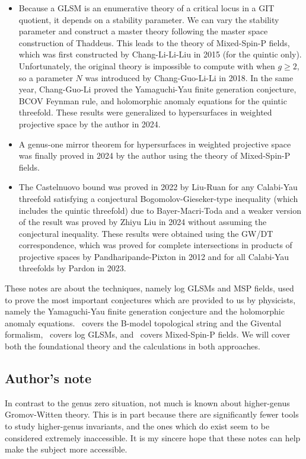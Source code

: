 \documentclass[10pt]{amsart}
\theoremstyle{definition}
\theoremstyle{remark}
\theoremstyle{plain}
\theoremstyle{definition}
\theoremstyle{remark}
\newcommand{\1}{\mathbf{1}}
\newcommand{\2}{\mathbf{2}}
\newcommand{\3}{\mathbf{3}}
\begin{document}
\begin{itemize}
    \item Because a GLSM is an enumerative theory of a critical locus in a GIT quotient, it depends on a stability parameter. We can vary the stability parameter and construct a master theory following the master space construction of Thaddeus. This leads to the theory of Mixed-Spin-P fields, which was first constructed by Chang-Li-Li-Liu in 2015 (for the quintic only). Unfortunately, the original theory is impossible to compute with when $g \geq 2$, so a parameter $N$ was introduced by Chang-Guo-Li-Li in 2018. In the same year, Chang-Guo-Li proved the Yamaguchi-Yau finite generation conjecture, BCOV Feynman rule, and holomorphic anomaly equations for the quintic threefold. These results were generalized to hypersurfaces in weighted projective space by the author in 2024.
    \item A genus-one mirror theorem for hypersurfaces in weighted projective space was finally proved in 2024 by the author using the theory of Mixed-Spin-P fields.
    \item The Castelnuovo bound was proved in 2022 by Liu-Ruan for any Calabi-Yau threefold satisfying a conjectural Bogomolov-Gieseker-type inequality (which includes the quintic threefold) due to Bayer-Macri-Toda and a weaker version of the result was proved by Zhiyu Liu in 2024 without assuming the conjectural inequality. These results were obtained using the GW/DT correspondence, which was proved for complete intersections in products of projective spaces by Pandharipande-Pixton in 2012 and for all Calabi-Yau threefolds by Pardon in 2023.
\end{itemize}

These notes are about the techniques, namely log GLSMs and MSP fields, used to prove the most important conjectures which are provided to us by physicists, namely the Yamaguchi-Yau finite generation conjecture and the holomorphic anomaly equations.~ covers the B-model topological string and the Givental formalism,~ covers log GLSMs, and~ covers Mixed-Spin-P fields. We will cover both the foundational theory and the calculations in both approaches. 

\subsection*{Author's note}%
\label{sub:Disclaimer}

In contrast to the genus zero situation, not much is known about higher-genus Gromov-Witten theory. This is in part because there are significantly fewer tools to study higher-genus invariants, and the ones which do exist seem to be considered extremely inaccessible. It is my sincere hope that these notes can help make the subject more accessible. 
\end{document}
